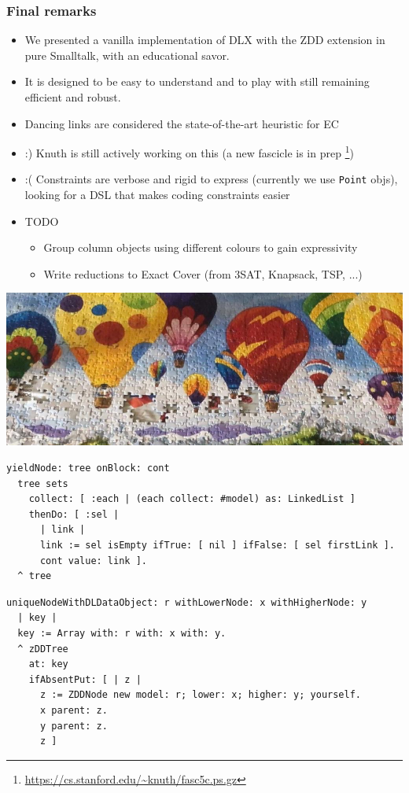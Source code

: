 \documentclass[10pt]{beamer}
\begin{document}
\begin{frame}[fragile]
\frametitle{Final remarks}
\begin{itemize}
  \item We presented a vanilla implementation of DLX with the ZDD extension
          in pure Smalltalk, with an educational savor.
  \item It is designed to be easy to understand and to play with
          still remaining efficient and robust.
  \item Dancing links are considered the state-of-the-art heuristic for EC
  \item :) Knuth is still actively working on this (a new fascicle is in prep \footnote{\url{https://cs.stanford.edu/~knuth/fasc5c.ps.gz}})
  \item :( Constraints are verbose and rigid to express (currently we use \texttt{Point} objs), 
        looking for a DSL that makes coding constraints easier
  \item TODO
    \begin{itemize}
      \item Group column objects using different colours to gain expressivity
      \item Write reductions to Exact Cover (from $3$SAT, Knapsack, TSP, ...)
    \end{itemize}
\end{itemize}
\end{frame}

\begin{frame}{ }
  \vfill
  \vfill
  \includegraphics[height=.5\textheight,width=\textwidth]{balloon-puzzle.jpg}
  \vfill
\end{frame}

\begin{frame}[fragile]
\begin{verbatim}
yieldNode: tree onBlock: cont
  tree sets
    collect: [ :each | (each collect: #model) as: LinkedList ]
    thenDo: [ :sel | 
      | link |
      link := sel isEmpty ifTrue: [ nil ] ifFalse: [ sel firstLink ].
      cont value: link ].
  ^ tree
\end{verbatim}
\vfill
\begin{verbatim}
uniqueNodeWithDLDataObject: r withLowerNode: x withHigherNode: y
  | key |
  key := Array with: r with: x with: y.
  ^ zDDTree
    at: key
    ifAbsentPut: [ | z |
      z := ZDDNode new model: r; lower: x; higher: y; yourself.
      x parent: z.
      y parent: z.
      z ]
\end{verbatim}
\end{frame}
\end{document}
